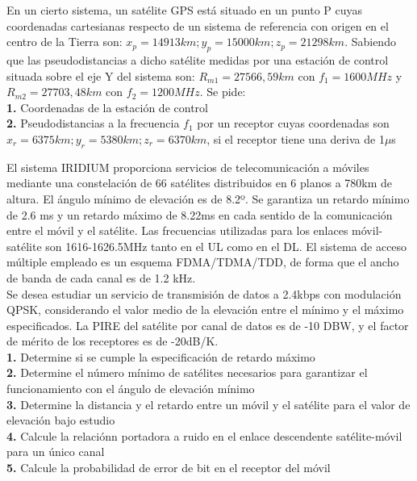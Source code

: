 \begin{exercise}[3]
	En un cierto sistema, un satélite GPS está situado en un punto P cuyas coordenadas cartesianas respecto de un sistema de referencia con origen en el centro de la Tierra son: $x_p=14913km;y_p=15000km;z_p=21298km$. Sabiendo que las pseudodistancias a dicho satélite medidas por una estación de control situada sobre el eje Y del sistema son: $R_{m1}=27566,59km$ con $f_1=1600MHz$ y $R_{m2}=27703,48km$ con $f_2=1200MHz$. Se pide:\\
	\textbf{1.} Coordenadas de la estación de control \\
	\textbf{2.} Pseudodistancias a la frecuencia $f_1$ por un receptor cuyas coordenadas son $x_r=6375km;y_r=5380km;z_r=6370km$, si el receptor tiene una deriva de 1$\mu$s
\end{exercise}
\begin{exercise}[4]
	El sistema IRIDIUM proporciona servicios de telecomunicación a móviles mediante una constelación de 66 satélites distribuidos en 6 planos a 780km de altura. El ángulo mínimo de elevación es de 8.2º. Se garantiza un retardo mínimo de 2.6 ms y un retardo máximo de 8.22ms en cada sentido de la comunicación entre el móvil y el satélite. Las frecuencias utilizadas para los enlaces móvil-satélite son 1616-1626.5MHz tanto en el UL como en el DL. El sistema de acceso múltiple empleado es un esquema FDMA/TDMA/TDD, de forma que el ancho de banda de cada canal es de 1.2 kHz.\\
	Se desea estudiar un servicio de transmisión de datos a 2.4kbps con modulación QPSK, considerando el valor medio de la elevación entre el mínimo y el máximo especificados. La PIRE del satélite por canal de datos es de -10 DBW, y el factor de mérito de los receptores es de -20dB/K.\\
	\textbf{1.} Determine si se cumple la especificación de retardo máximo\\
	\textbf{2.} Determine el número mínimo de satélites necesarios para garantizar el funcionamiento con el ángulo de elevación mínimo\\
	\textbf{3.} Determine la distancia y el retardo entre un móvil y el satélite para el valor de elevación bajo estudio\\
	\textbf{4.} Calcule la relaciónn portadora a ruido en el enlace descendente satélite-móvil para un único canal\\
	\textbf{5.} Calcule la probabilidad de error de bit en el receptor del móvil
\end{exercise}
